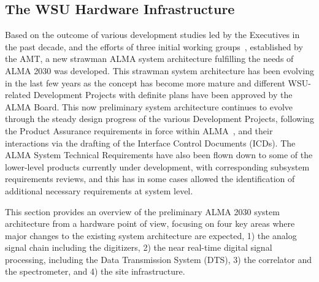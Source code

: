 \subsection{The WSU Hardware Infrastructure}



Based on the outcome of various development studies led by the Executives in the past decade, and the efforts of three initial working groups~\cite{2ndgen,fed,scwg}, established by the AMT, a new strawman ALMA system architecture fulfilling the needs of ALMA 2030 was developed. This strawman system architecture has been evolving in the last few years as the concept has become more mature and different WSU-related Development Projects with definite plans have been approved by the ALMA Board. This now preliminary system architecture continues to evolve through the steady design progress of the various Development Projects, following the Product Assurance requirements in force within ALMA~\cite{pa_req}, and their interactions via the drafting of the Interface Control Documents (ICDs). The ALMA System Technical Requirements have also been flown down to some of the lower-level products currently under development, with corresponding subsystem requirements reviews, and this has in some cases allowed the identification of additional necessary requirements at system level.

This section provides an overview of the preliminary ALMA 2030 system architecture from a hardware point of view, focusing on four key areas where major changes to the existing system architecture are expected, 1) the analog signal chain including the digitizers, 2) the near real-time digital signal processing, including the Data Transmission System (DTS), 3) the correlator and the spectrometer, and 4) the site infrastructure. 

